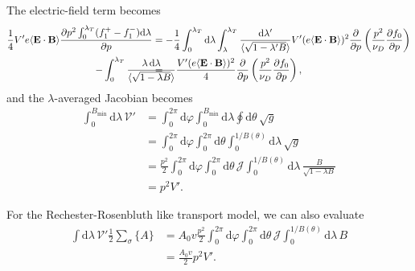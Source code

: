 \documentclass[11pt,a4paper]{article}
\newcommand{\rd}{\ensuremath{\mathrm{d}}}
\newcommand{\sub}[1]{\ensuremath{_{\text{#1}}}}
\renewcommand{\b}[1]{\ensuremath{ {\bf #1 } }}
\begin{document}
The electric-field term becomes
\begin{align}
\frac{1}{4} V' e\langle \b{E}\cdot\b{B}\rangle \frac{\partial p^2\int_0^{\lambda_T}(f_1^+-f_1^-)\rd\lambda}{\partial p} &= -\frac{1}{4}\int_0^{\lambda_T}\rd \lambda \int_\lambda^{\lambda_T} \frac{\rd \lambda'}{\langle\sqrt{1-\lambda' B}\rangle} V'(e\langle \b{E}\cdot\b{B}\rangle)^2\frac{\partial}{\partial p} \left(\frac{p^2}{\nu_D} \frac{\partial f_0}{\partial p}\right) \nonumber \\
&= \hspace{-25mm} -\int_0^{\lambda_T}\frac{\lambda\,\rd \lambda}{\langle\sqrt{1-\lambda B}\rangle} \frac{V'(e\langle \b{E}\cdot\b{B}\rangle)^2}{4} \frac{\partial}{\partial p} \left(\frac{p^2}{\nu_D}\frac{\partial f_0}{\partial p}\right) ,
\end{align}
and the $\lambda$-averaged Jacobian becomes
\begin{align}
\int_0^{B\sub{min}}\!\! \rd\lambda \,\mathcal{V}' &= \int_0^{2\pi}\rd\varphi \int_0^{B\sub{min}}\rd\lambda \oint \rd \theta \, \sqrt{g} \nonumber \\
&= \int_0^{2\pi} \rd\varphi \int_0^{2\pi}\rd\theta \int_0^{1/B(\theta)}\rd\lambda \,\sqrt{g} \nonumber \\
&= \frac{p^2}{2}\int_0^{2\pi} \rd\varphi \int_0^{2\pi}\rd\theta \,\mathcal{J}\int_0^{1/B(\theta)}\rd\lambda \,\frac{B}{\sqrt{1-\lambda B}} \nonumber \\
&= p^2V'.
\end{align}


For the Rechester-Rosenbluth like transport model, we can also evaluate
\begin{align}
\int \rd \lambda \, \mathcal{V}' \frac{1}{2}\sum_\sigma\{A\} &= A_0 v\frac{p^2}{2}\int_0^{2\pi} \rd\varphi \int_0^{2\pi}\rd\theta \,\mathcal{J}\int_0^{1/B(\theta)}\rd\lambda \, B \nonumber \\
&= \frac{A_0 v}{2}p^2 V'.
\end{align}
\end{document}
